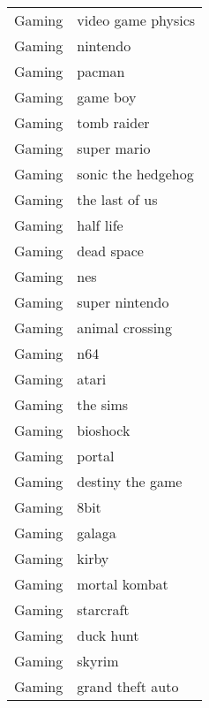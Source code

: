 \begin{supertabular}{l p{0.25\textwidth}}
           Gaming &                 video game physics \\
           Gaming &                           nintendo \\
           Gaming &                             pacman \\
           Gaming &                           game boy \\
           Gaming &                        tomb raider \\
           Gaming &                        super mario \\
           Gaming &                 sonic the hedgehog \\
           Gaming &                     the last of us \\
           Gaming &                          half life \\
           Gaming &                         dead space \\
           Gaming &                                nes \\
           Gaming &                     super nintendo \\
           Gaming &                    animal crossing \\
           Gaming &                                n64 \\
           Gaming &                              atari \\
           Gaming &                           the sims \\
           Gaming &                           bioshock \\
           Gaming &                             portal \\
           Gaming &                   destiny the game \\
           Gaming &                               8bit \\
           Gaming &                             galaga \\
           Gaming &                              kirby \\
           Gaming &                      mortal kombat \\
           Gaming &                          starcraft \\
           Gaming &                          duck hunt \\
           Gaming &                             skyrim \\
           Gaming &                   grand theft auto \\

\end{supertabular}
